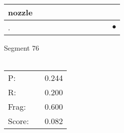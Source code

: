 \documentclass[landscape]{article}
\newcommand{\ssp}{\hspace{2pt}}
\newcommand{\mex}{\cellcolor{g}$\bullet$}
\begin{document}
\begin{tabular}{|l|p{10pt}|p{10pt}|p{10pt}|p{10pt}|p{10pt}|p{10pt}|p{10pt}|p{10pt}|p{10pt}|p{10pt}|}
\hline
\ssp nozzle \ssp&\hspace{2pt}&\hspace{2pt}&\hspace{2pt}&\hspace{2pt}&\hspace{2pt}&\hspace{2pt}&\hspace{2pt}&\hspace{2pt}&\hspace{2pt}&\hspace{2pt}\\
\hline
\ssp \cellcolor{ref9}. \ssp&\hspace{2pt}&\hspace{2pt}&\hspace{2pt}&\hspace{2pt}&\hspace{2pt}&\hspace{2pt}&\hspace{2pt}&\hspace{2pt}&\hspace{2pt}&\hspace{2pt}\mex\\
\hline
\end{tabular}

\vspace{6pt}
\noindent Segment 76\\\\
\noindent\begin{tabular}{lm{12pt}r}
\hline
P:&&0.244\\
R:&&0.200\\
Frag:&&0.600\\
Score:&&0.082\\
\end{tabular}

\newpage
\end{document}
